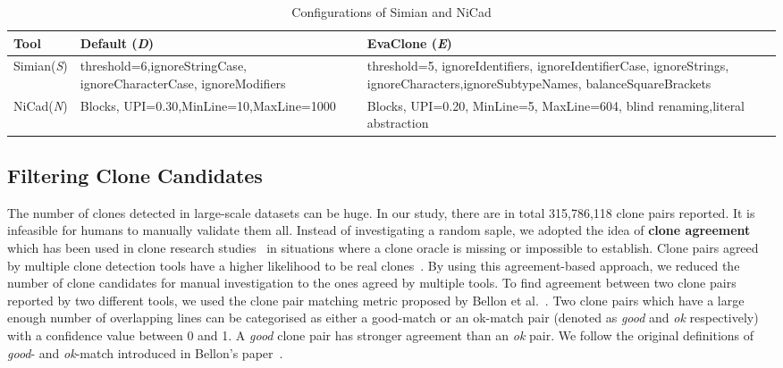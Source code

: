 \documentclass[sigconf,review, anonymous]{acmart}
\begin{document}
\begin{table}
	\centering
	\caption{Configurations of Simian and NiCad}
	\label{t:param_tuning}
	\small
	\begin{tabular}{p{0.7cm}|p{2.4cm}|p{3.5cm}}
		\hline 
		Tool & Default (\textit{D}) & EvaClone (\textit{E}) \\
		\hline
		Simian\newline (\textit{S}) &  threshold=6,\newline ignoreStringCase, \newline ignoreCharacterCase, \newline ignoreModifiers & threshold=5, ignoreIdentifiers, \newline ignoreIdentifierCase, \newline ignoreStrings, \newline ignoreCharacters,\newline ignoreSubtypeNames, \newline balanceSquareBrackets \\ 
		\hline 
		NiCad\newline (\textit{N}) & Blocks, UPI=0.30,\newline MinLine=10,\newline MaxLine=1000 & Blocks, UPI=0.20, \newline MinLine=5, MaxLine=604, \newline blind renaming,\newline literal abstraction \\
		\hline
	\end{tabular} %
\end{table}

\subsection{Filtering Clone Candidates}

The number of clones detected in large-scale datasets can be huge. In
our study, there are in total 315,786,118 clone pairs reported. It is
infeasible for humans to manually validate them all. Instead of
investigating a random saple, we adopted the idea of \textbf{clone
  agreement} which has been used in clone research
studies~\cite{Funaro2010, Wang2013,cr2016ssbse} in situations where a
clone oracle is missing or impossible to establish. Clone pairs agreed
by multiple clone detection tools have a higher likelihood to be real
clones~\cite{cr2016ssbse}. By using this agreement-based approach, we
reduced the number of clone candidates for manual investigation to the
ones agreed by multiple tools. To find agreement between two clone
pairs reported by two different tools, we used the clone pair matching
metric proposed by Bellon et al.~\cite{Bellon2007}. Two clone pairs
which have a large enough number of overlapping lines can be
categorised as either a good-match or an ok-match pair (denoted as
\textit{good} and \textit{ok} respectively) with a confidence value
between 0 and 1. A \textit{good} clone pair has stronger agreement
than an \textit{ok} pair. We follow the original definitions of
\textit{good}- and \textit{ok}-match introduced in Bellon's
paper~\cite{Bellon2007}.
\end{document}
